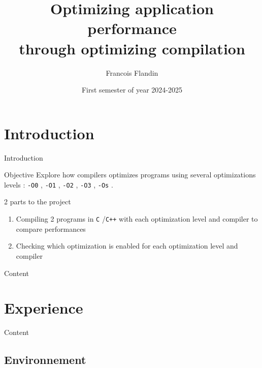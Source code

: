\documentclass{beamer}
\title{Optimizing application performance \\ through optimizing compilation}
\author{Francois Flandin}
\date{First semester of year 2024-2025}
\newcommand{\optizero}{\texttt{-O0} }
\newcommand{\optione}{\texttt{-O1} }
\newcommand{\optitwo}{\texttt{-O2} }
\newcommand{\optithree}{\texttt{-O3} }
\newcommand{\optisize}{\texttt{-Os} }
\newcommand{\clgg}{\texttt{C} }
\newcommand{\cpp}{\texttt{C++} }
\begin{document}
    
    \maketitle
    
    \section{Introduction}
    \begin{frame}{Introduction}
        \begin{block}{Objective}
            Explore how compilers optimizes programs using several optimizations levels : \optizero, \optione, \optitwo, \optithree, \optisize.
        \end{block}
        \begin{block}{2 parts to the project}
            \begin{enumerate}
            \item Compiling 2 programs in \clgg/\cpp with each optimization level and compiler to compare performances
            \item Checking which optimization is enabled for each optimization level and compiler
            \end{enumerate}
        \end{block}
    \end{frame}
    
    \begin{frame}[noframenumbering]{Content}
        \tableofcontents
    \end{frame}
    
    \section{Experience}
    \begin{frame}[noframenumbering]{Content}
        \tableofcontents[currentsection]
    \end{frame}
    
    \subsection{Environnement}
        
\end{document}
